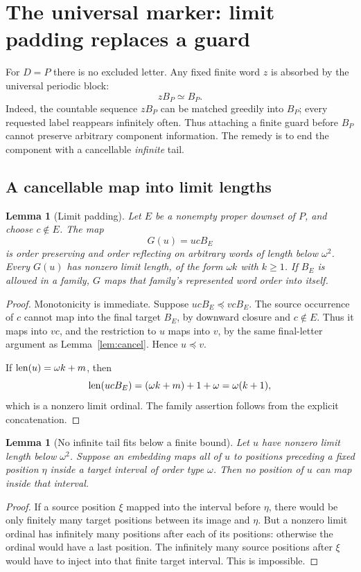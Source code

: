 \documentclass[11pt,a4paper]{article}
\numberwithin{equation}{section}
\newtheorem{lemma}[theorem]{Lemma}
\theoremstyle{definition}
\theoremstyle{remark}
\newcommand{\len}{\mathop{\rm len}}
\newcommand{\emb}{\preccurlyeq}
\newcommand{\eqv}{\simeq}
\begin{document}
\section{The universal marker: limit padding replaces a guard}
\label{sec:universal}

For $D=P$ there is no excluded letter. Any fixed finite word $z$ is absorbed
by the universal periodic block:
\begin{equation}\label{eq:absorb}
 zB_P\eqv B_P.
\end{equation}
Indeed, the countable sequence $zB_P$ can be matched greedily into $B_P$;
every requested label reappears infinitely often. Thus attaching a finite
guard before $B_P$ cannot preserve arbitrary component information.
The remedy is to end the component with a cancellable \emph{infinite} tail.

\subsection{A cancellable map into limit lengths}

\begin{lemma}[Limit padding]\label{lem:padding}
Let $E$ be a nonempty proper downset of $P$, and choose $c\notin E$.
The map
\begin{equation}\label{eq:padding}
 G(u)=ucB_E
\end{equation}
is order preserving and order reflecting on arbitrary words of length
below $\omega^2$. Every $G(u)$ has nonzero limit length, of the form
$\omega k$ with $k\ge1$. If $B_E$ is allowed in a family, $G$ maps that
family's represented word order into itself.
\end{lemma}
\begin{proof}
Monotonicity is immediate. Suppose $ucB_E\emb vcB_E$. The source occurrence
of $c$ cannot map into the final target $B_E$, by downward closure and
$c\notin E$. Thus it maps into $vc$, and the restriction to $u$ maps into
$v$, by the same final-letter argument as Lemma~\ref{lem:cancel}. Hence
$u\emb v$.

If $\len(u)=\omega k+m$, then
\[
 \len(ucB_E)=(\omega k+m)+1+\omega=\omega(k+1),
\]
which is a nonzero limit ordinal. The family assertion follows from the
explicit concatenation.
\end{proof}

\begin{lemma}[No infinite tail fits below a finite bound]\label{lem:noleak}
Let $u$ have nonzero limit length below $\omega^2$. Suppose an embedding
maps all of $u$ to positions preceding a fixed position $\eta$ inside a
target interval of order type $\omega$. Then no position of $u$ can map
inside that interval.
\end{lemma}
\begin{proof}
If a source position $\xi$ mapped into the interval before $\eta$, there
would be only finitely many target positions between its image and
$\eta$. But a nonzero limit ordinal has infinitely many positions after
each of its positions: otherwise the ordinal would have a last position.
The infinitely many source positions after $\xi$ would have to inject into
that finite target interval. This is impossible.
\end{proof}
\end{document}
